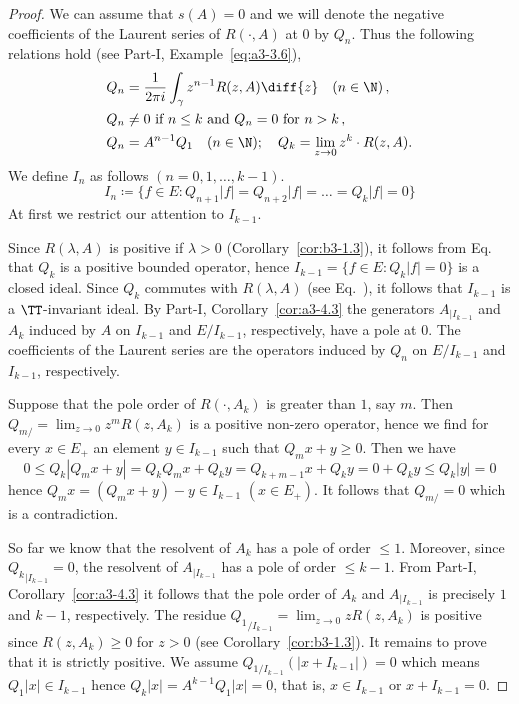\begin{proof}
	We can assume that $s(A) = 0$ and we will denote the negative coefficients of the Laurent series of\/ $R(\cdot,A)$ at $0$ by $Q_{n}$.
	Thus the following relations hold (see Part-I, Example~\ref{eq:a3-3.6}),
	\begin{equation}\label{eq:b3-2.17}
	\begin{split}
		Q_{n} &= \frac{1}{2\pi i}\int_{\gamma} z^{n-1}R(z,A)  \diff{z} \quad (n \in \N)\,, \\
		Q_{n} &\neq 0 \text{ if } n \leq k \text{ and } Q_{n} = 0 \text{ for } n > k\,, \\
		Q_{n} &= A^{n-1}Q_{1} \quad (n \in \N); \quad Q_{k} = \lim_{z \to 0}z^{k}\cdot R(z,A).
	\end{split}
	\end{equation}
	We define $I_{n}$ as follows $(n = 0,1,\ldots,k-1)$.
	\[
	I_{n} \coloneqq \{f \in E \colon Q_{n+1}|f| = Q_{n+2}|f| = \ldots = Q_{k}|f| = 0\}
	\]
	At first we restrict our attention to $I_{k-1}$.
	
	Since $R(\lambda,A)$ is positive if\/ $\lambda > 0$ (Corollary~\ref{cor:b3-1.3}), it follows from Eq.~ that $Q_{k}$ is a positive bounded operator, hence $I_{k-1} = \{f \in E \colon Q_{k}|f| = 0\}$ is a closed ideal.
	Since $Q_{k}$ commutes with $R(\lambda,A)$ (see Eq.~), it follows that $I_{k-1}$ is a $\TT$-invariant ideal.
	By Part-I, Corollary~\ref{cor:a3-4.3} the generators $A_{|I_{k-1}}$ and $A_{k}$ induced by $A$ on $I_{k-1}$ and $E/I_{k-1}$, respectively, have a pole at $0$.
	The coefficients of the Laurent series are the operators induced by $Q_{n}$ on $E/I_{k-1}$ and $I_{k-1}$, respectively.
	
	Suppose that the pole order of\/ $R(\cdot,A_{k})$ is greater than $1$, say $m$.
	Then $Q_{m/} = \lim_{z \to 0}z^{m}R(z,A_{k})$ is a positive non-zero operator, hence we find for every $x \in E_{+}$ an element $y \in I_{k-1}$ such that $Q_{m}x + y \geq 0$.
	Then we have
	\[
	0 \leq Q_{k}|Q_{m}x + y| = Q_{k}Q_{m}x + Q_{k}y = Q_{k+m-1}x + Q_{k}y = 0 + Q_{k}y \leq Q_{k}|y| = 0
	\]
	hence $Q_{m}x = (Q_{m}x + y) - y \in I_{k-1}$ $(x \in E_{+})$.
	It follows that $Q_{m/} = 0$ which is a contradiction.
	
	So far we know that the resolvent of\/ $A_{k}$ has a pole of order $\leq 1$.
	Moreover, since ${Q_{k}}_{|I_{k-1}} = 0$, 
	the resolvent of\/ $A_{|I_{k-1}}$ has a pole of order $\leq k-1$.
	From Part-I, Corollary~\ref{cor:a3-4.3} it follows that the pole order of\/ $A_{k}$ and $A_{|I_{k-1}}$ is precisely $1$ and $k-1$, respectively.
	The residue ${Q_{1}}_{/I_{k-1}} = \lim_{z \to 0}zR(z,A_{k})$ is positive since $R(z,A_{k}) \geq 0$ for $z > 0$ (see Corollary~\ref{cor:b3-1.3}).
	It remains to prove that it is strictly positive. We assume $Q_{1/I_{k-1}}(|x + I_{k-1}|) = 0$ which means $Q_{1}|x| \in I_{k-1}$ hence $Q_{k}|x| = A^{k-1}Q_{1}|x| = 0$, that is, $x \in I_{k-1}$ or $x + I_{k-1} = 0$.
	

\end{proof}
